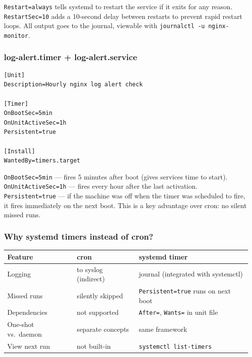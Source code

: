 \documentclass[11pt,a4paper]{article}
\begin{document}
\texttt{Restart=always} tells systemd to restart the service if it exits for any reason. \texttt{RestartSec=10} adds a 10-second delay between restarts to prevent rapid restart loops. All output goes to the journal, viewable with \texttt{journalctl -u nginx-monitor}.

\subsubsection{log-alert.timer + log-alert.service}

\begin{lstlisting}[caption={systemd/log-alert.timer}]
[Unit]
Description=Hourly nginx log alert check

[Timer]
OnBootSec=5min
OnUnitActiveSec=1h
Persistent=true

[Install]
WantedBy=timers.target
\end{lstlisting}

\texttt{OnBootSec=5min} — fires 5 minutes after boot (gives services time to start).\\
\texttt{OnUnitActiveSec=1h} — fires every hour after the last activation.\\
\texttt{Persistent=true} — if the machine was off when the timer was scheduled to fire, it fires immediately on the next boot. This is a key advantage over cron: no silent missed runs.

\subsubsection{Why systemd timers instead of cron?}

\begin{center}
\begin{tabular}{L{4.5cm}L{4.5cm}L{4.5cm}}
\toprule
\textbf{Feature} & \textbf{cron} & \textbf{systemd timer} \\
\midrule
Logging              & to syslog (indirect)    & journal (integrated with systemctl) \\
Missed runs          & silently skipped         & \texttt{Persistent=true} runs on next boot \\
Dependencies         & not supported            & \texttt{After=}, \texttt{Wants=} in unit file \\
One-shot vs.\ daemon & separate concepts        & same framework \\
View next run        & not built-in             & \texttt{systemctl list-timers} \\
\bottomrule
\end{tabular}
\end{center}
\end{document}
